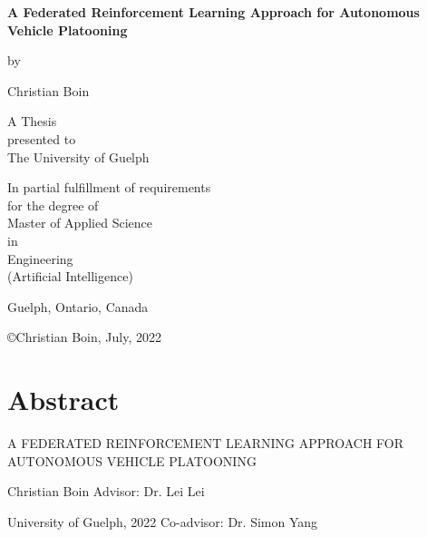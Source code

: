 \documentclass[oneside, 12pt]{book}
\let\oldfrontmatter\frontmatter
\gdef\frontmatter{\oldfrontmatter\pagestyle{plain}}
\begin{document}
\frontmatter
\begin{titlepage}
	\setlength{\parskip}{12pt}
	\centering
	{\textbf{\LARGE A Federated Reinforcement Learning Approach for Autonomous Vehicle Platooning}\par}
	\vspace{1.5 cm}
	{by}\par
	{Christian Boin}\par
	\vspace{2cm}
	{A Thesis\\
	presented to\\
	The University of Guelph}\par
	\vspace{2cm}
	{In partial fulfillment of requirements\\
	for the degree of\\
	Master of Applied Science\\
	in\\
	Engineering\\
	(Artificial Intelligence)}\par
	\vspace{2cm}
	{\normalsize Guelph, Ontario, Canada}\par
	\vspace{0.25cm}
	{\copyright\hspace{6pt}Christian Boin, July, 2022}\par
\end{titlepage}

\addtocounter{page}{1} %

\chapter*{\centering Abstract}
\thispagestyle{empty} %
\pagestyle{empty} %
\begin{center} A FEDERATED REINFORCEMENT LEARNING APPROACH FOR AUTONOMOUS VEHICLE PLATOONING \end{center}

\noindent Christian Boin \hfill Advisor: Dr. Lei Lei

\noindent University of Guelph, 2022  \hfill Co-advisor: Dr. Simon Yang
\vspace{12pt}
\end{document}
